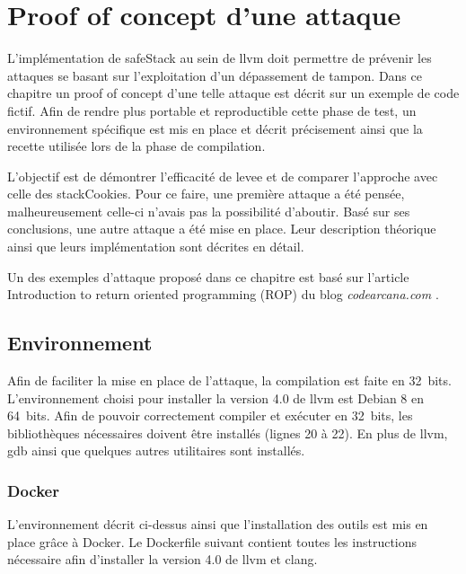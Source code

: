 \chapter{Proof of concept d'une attaque}
\label{chap:attaque}

L'implémentation de \gls{safeStack} au sein de \gls{llvm} doit permettre de prévenir les attaques se basant sur l'exploitation d'un dépassement de tampon. Dans ce chapitre un \og proof of concept \fg d'une telle attaque est décrit sur un exemple de code fictif. Afin de rendre plus portable et reproductible cette phase de test, un environnement spécifique est mis en place et décrit précisement ainsi que la recette utilisée lors de la phase de compilation.

L'objectif est de démontrer l'efficacité de \gls{levee} et de comparer l'approche avec celle des \gls{stackCookies}. Pour ce faire, une première attaque a été pensée, malheureusement celle-ci n'avais pas la possibilité d'aboutir. Basé sur ses conclusions, une autre attaque a été mise en place. Leur description théorique ainsi que leurs implémentation sont décrites en détail.

Un des exemples d'attaque proposé dans ce chapitre est basé sur l'article \og Introduction to return oriented programming (ROP) \fg du blog \textit{codearcana.com} \cite{IntroductionToROP}.

\minitoc

\newpage

\section{Environnement}

Afin de faciliter la mise en place de l'attaque, la compilation est faite en 32~bits. L'environnement choisi pour installer la version 4.0 de \gls{llvm} est Debian 8 en 64~bits. Afin de pouvoir correctement compiler et exécuter en 32~bits, les bibliothèques nécessaires doivent être installés (lignes 20 à 22). En plus de \gls{llvm}, \gls{gdb} ainsi que quelques autres utilitaires sont installés.

\subsection{Docker}

L'environnement décrit ci-dessus ainsi que l'installation des outils est mis en place grâce à Docker. Le Dockerfile suivant contient toutes les instructions nécessaire afin d'installer la version 4.0 de \gls{llvm} et \gls{clang}.

